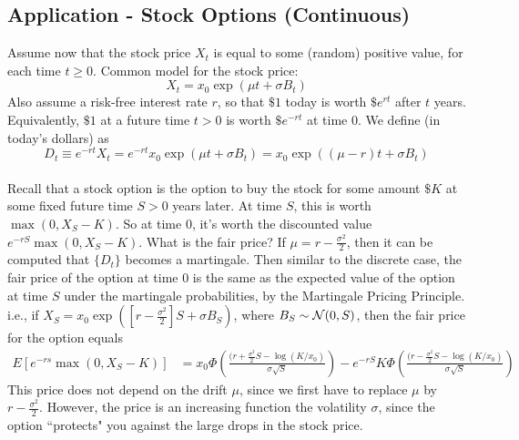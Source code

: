 \documentclass[11pt]{article}
\begin{document}
   	\subsection{Application - Stock Options (Continuous)}
   	Assume now that the stock price $X_t$ is equal to some (random) positive value, for each time $t \geq 0$. Common model for the stock price:
   	$$X_t = x_0\exp(\mu t + \sigma B_t)$$
   	Also assume a risk-free interest rate $r$, so that $\$ 1$ today is worth $\$ e^{rt}$ after $t$ years. Equivalently, $\$ 1$ at a future time $t > 0$ is worth $\$ e^{-rt}$ at time $0$. 
   	We define  (in today's dollars) as
   	$$D_t \equiv e^{-rt}X_t = e^{-rt}x_0\exp(\mu t + \sigma B_t) = x_0 \exp((\mu - r)t + \sigma B_t)$$\\
   	Recall that a stock option is the option to buy the stock for some amount $\$ K$ at some fixed future time $S > 0$ years later. At time $S$, this is worth $\max(0, X_S - K)$. So at time 0, it's worth the discounted value $e^{-rS}\max(0, X_S - K)$. 
   	\remark
   	What is the fair price?
   	\fact
   	If $\mu = r - \frac{\sigma^2}{2}$, then it can be computed that $\{D_t\}$ becomes a martingale. Then similar to the discrete case, the fair price of the option at time 0 is the same as the expected value of the option at time $S$ under the martingale probabilities, by the Martingale Pricing Principle.\\
   	i.e., if $X_S = x_0\exp([r - \frac{\sigma^2}{2}]S + \sigma B_S)$, where $B_S \sim \mathcal{N}(0,S)$, then the fair price for the option equals
   	\begin{align*}
   		E[e^{-rs}\max(0, X_S - K)] &= x_0\Phi\left( \frac{(r+\frac{\sigma^2}{2}S - \log(K/x_0)}{\sigma\sqrt{S}} \right) - e^{-rS}K\Phi\left( \frac{(r-\frac{\sigma^2}{2}S - \log(K/x_0)}{\sigma \sqrt{S}}\right)
   	\end{align*}
   	\remark
   	This price does not depend on the drift $\mu$, since we first have to replace $\mu$ by $r - \frac{\sigma^2}{2}$. However, the price is an increasing function the volatility $\sigma$, since the option ``protects" you against the large drops in the stock price.
   	
\end{document}

